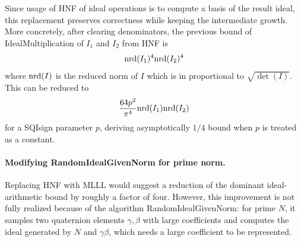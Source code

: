Since usage of HNF of ideal operations is to compute a basis of the result ideal, this replacement preserves correctness while keeping the intermediate growth.
More concretely, after clearing denominators, the previous bound of \textsf{IdealMultiplication} of $I_1$ and $I_2$ from HNF is \[\mathrm{nrd}(I_1)^4\mathrm{nrd}(I_2)^4\] where $\mathrm{nrd}(I)$ is the reduced norm of $I$ which is in proportional to $\sqrt{\det(I)}$.
This can be reduced to \[\frac{64p^2}{\pi^4}\mathrm{nrd}(I_1)\mathrm{nrd}(I_2)\] for a SQIsign parameter $p$, deriving asymptotically $1/4$ bound when $p$ is treated as a constant.


\paragraph{Modifying \textsf{RandomIdealGivenNorm} for prime norm.}
Replacing HNF with MLLL would suggest a reduction of the dominant ideal-arithmetic bound by roughly a factor of four.
However, this improvement is not fully realized because of the algorithm \textsf{RandomIdealGivenNorm}:
for prime $N$, it samples two quaternion elements $\gamma,\beta$ with large coefficients and computes the ideal generated by $N$ and $\gamma\beta$, which needs a large coefficient to be represented.

